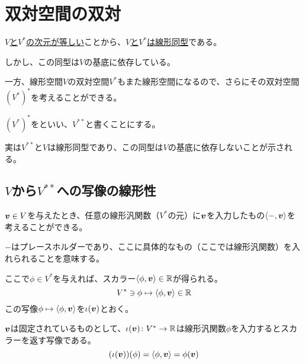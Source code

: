 \documentclass[../../../topic_linear-algebra]{subfiles}
\begin{document}
\sectionline
\section{双対空間の双対}

\begin{mindflow}
\end{mindflow}

\hyperref[thm:dual-basis-dimension]{$V$と$V^*$の次元が等しい}ことから、\hyperref[thm:abstract-linear-pigeonhole]{$V$と$V^*$は線形同型}である。

しかし、この同型は$V$の基底に依存している。

\br

一方、線形空間$V$の双対空間$V^*$もまた線形空間になるので、さらにその双対空間$(V^*)^*$を考えることができる。

$(V^*)^*$をといい、$V^{**}$と書くことにする。

\br

実は$V^{**}$と$V$は線形同型であり、この同型は$V$の基底に依存しないことが示される。

\subsection{$V$から$V^{**}$への写像の線形性}

$\vb*{v} \in V$を与えたとき、任意の線形汎関数（$V^*$の元）に$\vb*{v}$を入力したもの$\langle -, \vb*{v} \rangle$を考えることができる。

\begin{supplnote}
  $-$はプレースホルダーであり、ここに具体的なもの（ここでは線形汎関数）を入れられることを意味する。
\end{supplnote}

ここで$\phi \in V^*$を与えれば、スカラー$\langle \phi, \vb*{v} \rangle \in \mathbb{R}$が得られる。
\begin{equation*}
  V^* \ni \phi \mapsto \langle \phi, \vb*{v} \rangle \in \mathbb{R}
\end{equation*}
この写像$\phi \mapsto \langle \phi, \vb*{v} \rangle$を$\iota(\vb*{v})$とおく。

$\vb*{v}$は固定されているものとして、$\iota(\vb*{v}) \colon V^* \to \mathbb{R}$は線形汎関数$\phi$を入力するとスカラーを返す写像である。
\begin{equation*}
  (\iota(\vb*{v}))(\phi) = \langle \phi, \vb*{v} \rangle = \phi(\vb*{v})
\end{equation*}
\end{document}
